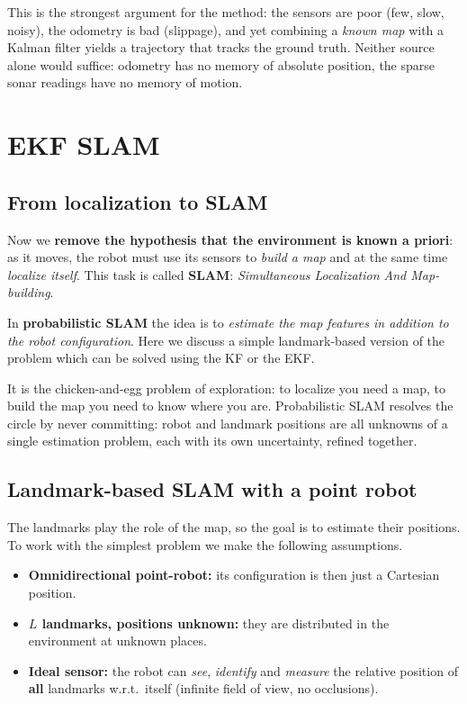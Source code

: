 \documentclass[11pt,a4paper]{article}
\newcommand{\slides}[1]{\texorpdfstring{\hspace{0.5em}{\normalfont\small\emph{(#1)}}}{}}
\theoremstyle{definition}
\theoremstyle{plain}
\theoremstyle{remark}
\begin{document}
\begin{intuition}
This is the strongest argument for the method: the sensors are poor (few, slow, noisy), the odometry is bad (slippage), and yet combining a \emph{known map} with a Kalman filter yields a trajectory that tracks the ground truth. Neither source alone would suffice: odometry has no memory of absolute position, the sparse sonar readings have no memory of motion.
\end{intuition}

\section{EKF SLAM}
\slides{slides 18--23}

\subsection{From localization to SLAM}
\slides{slides 18}

Now we \textbf{remove the hypothesis that the environment is known a priori}: as it moves, the robot must use its sensors to \emph{build a map} and at the same time \emph{localize itself}. This task is called \textbf{SLAM}: \emph{Simultaneous Localization And Map-building}.

In \textbf{probabilistic SLAM} the idea is to \emph{estimate the map features in addition to the robot configuration}. Here we discuss a simple landmark-based version of the problem which can be solved using the KF or the EKF.

\begin{intuition}
It is the chicken-and-egg problem of exploration: to localize you need a map, to build the map you need to know where you are. Probabilistic SLAM resolves the circle by never committing: robot and landmark positions are all unknowns of a single estimation problem, each with its own uncertainty, refined together.
\end{intuition}

\subsection{Landmark-based SLAM with a point robot}
\slides{slides 19--23}

The landmarks play the role of the map, so the goal is to estimate their positions. To work with the simplest problem we make the following assumptions.
\begin{itemize}
  \item \textbf{Omnidirectional point-robot:} its configuration is then just a Cartesian position.
  \item \textbf{$L$ landmarks, positions unknown:} they are distributed in the environment at unknown places.
  \item \textbf{Ideal sensor:} the robot can \emph{see}, \emph{identify} and \emph{measure} the relative position of \textbf{all} landmarks w.r.t.\ itself (infinite field of view, no occlusions).
\end{itemize}
\end{document}
